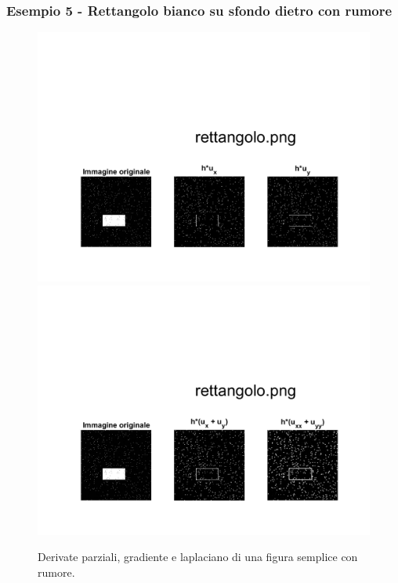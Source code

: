 \subsubsection{Esempio 5 - Rettangolo bianco su sfondo dietro con rumore}
\begin{figure}   
\centering
\includegraphics[scale=0.4, trim = 0 0 0 10.5cm, clip]{Pictures/Risultati/rettangolo bianco e nero derivate parziali con rumore.png}
\includegraphics[scale=0.4, trim = 0 0 0 10.5cm, clip]{Pictures/Risultati/rettangolo bianco e nero gradiente e laplaciano con rumore.png}
\caption{Derivate parziali, gradiente e laplaciano di una figura semplice con rumore.}\label{fig:figura}
\end{figure}

